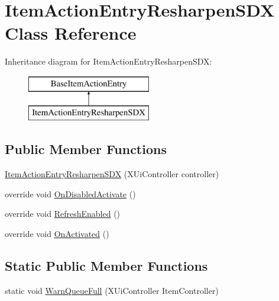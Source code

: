 \hypertarget{class_item_action_entry_resharpen_s_d_x}{}\section{Item\+Action\+Entry\+Resharpen\+S\+DX Class Reference}
\label{class_item_action_entry_resharpen_s_d_x}
Inheritance diagram for Item\+Action\+Entry\+Resharpen\+S\+DX\+:\begin{figure}[H]
\begin{center}
\leavevmode
\includegraphics[height=2.000000cm]{class_item_action_entry_resharpen_s_d_x}
\end{center}
\end{figure}
\subsection*{Public Member Functions}
\begin{DoxyCompactItemize}
\item 
\mbox{\hyperlink{class_item_action_entry_resharpen_s_d_x_ac0907b467043c8677f1f4e520cb5015f}{Item\+Action\+Entry\+Resharpen\+S\+DX}} (X\+Ui\+Controller controller)
\item 
override void \mbox{\hyperlink{class_item_action_entry_resharpen_s_d_x_aaceea0c8f316332271b4c72bcaf5619b}{On\+Disabled\+Activate}} ()
\item 
override void \mbox{\hyperlink{class_item_action_entry_resharpen_s_d_x_a524f80b83cfc9eb840aa654215f3ed1b}{Refresh\+Enabled}} ()
\item 
override void \mbox{\hyperlink{class_item_action_entry_resharpen_s_d_x_a00ee6e81481137ca604764d88963df02}{On\+Activated}} ()
\end{DoxyCompactItemize}
\subsection*{Static Public Member Functions}
\begin{DoxyCompactItemize}
\item 
static void \mbox{\hyperlink{class_item_action_entry_resharpen_s_d_x_af7e651fba91d1e3b636b748e658f63e7}{Warn\+Queue\+Full}} (X\+Ui\+Controller Item\+Controller)
\end{DoxyCompactItemize}


